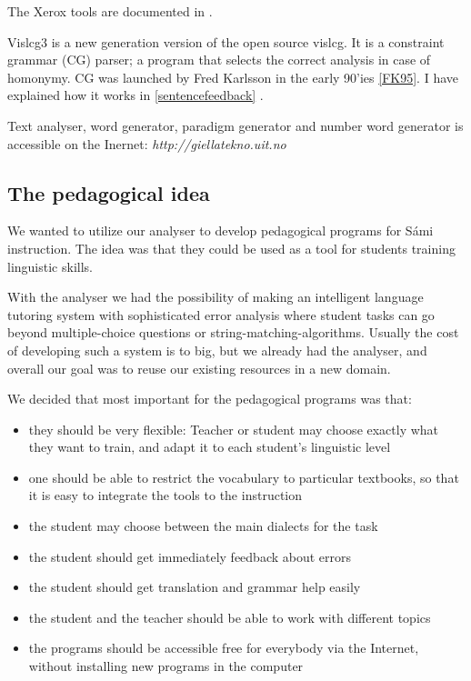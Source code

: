 \documentclass[a4paper,12pt]{article}
\begin{document}
The Xerox tools are documented in \citep{BeesleyKarttunen}. 

Vislcg3 is a new generation version of the open source vislcg. It is a constraint grammar (CG) parser; a program that selects the correct analysis in case of homonymy. CG was launched by Fred Karlsson in the early 90'ies \ref{FK95}. I have explained how it works in \ref{sentencefeedback}
.

Text analyser, word generator, paradigm generator and number word generator is accessible on the Inernet: \textit{http://giellatekno.uit.no}

\subsection{The pedagogical idea}
We wanted to utilize our analyser to develop pedagogical programs for Sámi instruction. The idea was that they could be used as a tool for students training linguistic skills. 

With the analyser we had the possibility of making an intelligent language tutoring system with sophisticated error analysis where student tasks can go beyond multiple-choice questions or string-matching-algorithms. Usually the cost of developing such a system is to big, but we already had the analyser, and overall our goal was to reuse our existing resources in a new domain.

We decided that most important for the pedagogical programs was that:

\begin{itemize}
\item they should be very flexible: Teacher or student may choose exactly what they want to train, and adapt it to each student's linguistic level 
\item one should be able to restrict the vocabulary to particular textbooks, so that it is easy to integrate the tools to the instruction
\item the student may choose between the main dialects for the task
\item the student should get immediately feedback about errors
\item the student should get translation and grammar help easily
\item the student and the teacher should be able to work with different topics 
\item the programs should be accessible free for everybody via the Internet, without installing new programs in the computer
\end{itemize}
\end{document}
